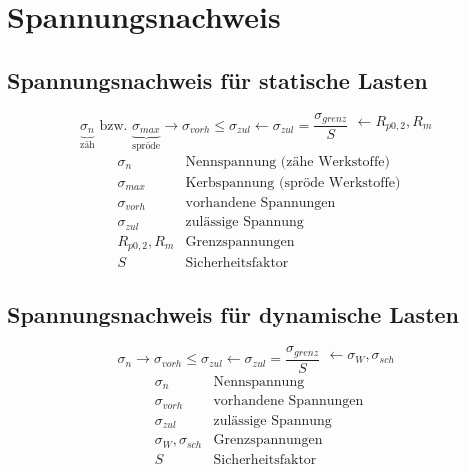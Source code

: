 



\section{Spannungsnachweis}

\subsection{Spannungsnachweis für statische Lasten}
\[ \underbrace{\sigma_n}_\text{zäh} \text{ bzw. } \underbrace{\sigma_{max}}_\text{spröde} \rightarrow \sigma_{vorh} \leq \sigma_{zul} \leftarrow \sigma_{zul} = \frac{\sigma_{grenz}}{S} \begin{matrix} \leftarrow R_{p0,2}, R_m\\~ \end{matrix} \]
\[ \begin{array}{ll}
\sigma_n & \text{Nennspannung (zähe Werkstoffe)}\\
\sigma_{max} & \text{Kerbspannung (spröde Werkstoffe)}\\
\sigma_{vorh} & \text{vorhandene Spannungen}\\
\sigma_{zul} & \text{zulässige Spannung}\\
R_{p0,2}, R_m & \text{Grenzspannungen}\\
S & \text{Sicherheitsfaktor}
\end{array} \]

\subsection{Spannungsnachweis für dynamische Lasten}
\[ \sigma_n  \rightarrow \sigma_{vorh} \leq \sigma_{zul} \leftarrow \sigma_{zul} = \frac{\sigma_{grenz}}{S} \begin{matrix} \leftarrow \sigma_W, \sigma_{sch}\\~ \end{matrix} \]
\[ \begin{array}{ll}
\sigma_n & \text{Nennspannung}\\
\sigma_{vorh} & \text{vorhandene Spannungen}\\
\sigma_{zul} & \text{zulässige Spannung}\\
\sigma_W, \sigma_{sch} & \text{Grenzspannungen}\\
S & \text{Sicherheitsfaktor}
\end{array} \]

